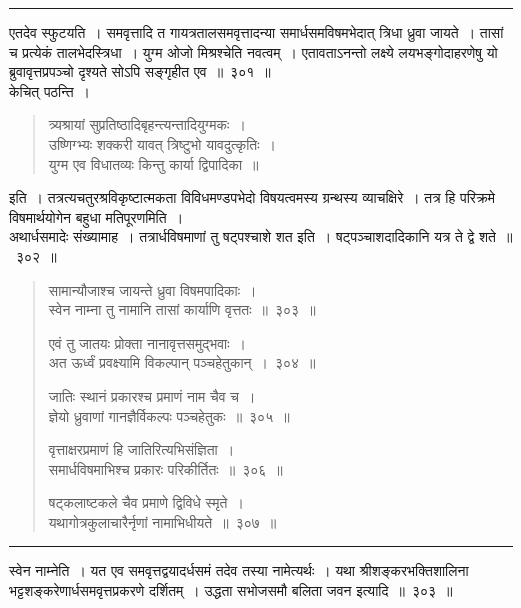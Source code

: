 \documentclass[11pt, openany]{book}
\begin{document}
\hrule

\vspace{2mm}
एतदेव स्फुटयति~। {\qtt समवृत्तादि} त गायत्रतालसमवृत्तादन्या समार्धसमविषमभेदात् त्रिधा ध्रुवा जायते~। तासां च प्रत्येकं तालभेदस्त्रिधा~। {\qtt युग्म ओजो मिश्रश्चेति} नवत्वम्~। एतावताऽनन्तो लक्ष्ये लयभङ्गोदाहरणेषु यो ब्रुवावृत्तप्रपञ्चो दृश्यते सोऽपि सङ्गृहीत एव~॥~३०१~॥\\

केचित् पठन्ति~। 

\begin{quote}
{\qt त्र्यश्रायां सुप्रतिष्ठादिबृहन्त्यन्तादियुग्मकः~। \\
 उष्णिग्भ्यः शक्करी यावत् त्रिष्टुभो यावदुत्कृतिः~।\\
 युग्म एव विधातव्यः किन्तु कार्या द्विपादिका~॥}
\end{quote}

\noindent
इति~। तत्रत्यचतुरश्रविकृष्टात्मकता विविधमण्डपभेदो विषयत्वमस्य ग्रन्थस्य व्याचक्षिरे~। तत्र हि परिक्रमे विषमार्थयोगेन बहुधा मतिपूरणमिति~।\\

अथार्धसमादेः संख्यामाह~। {\qtt तत्रार्धविषमाणां तु षट्पश्चाशे शत} इति~। षट्पञ्चाशदादिकानि यत्र ते द्वे शते~॥~३०२~॥

\newpage

\begin{quote}
{\na सामान्यौजाश्च जायन्ते ध्रुवा विषमपादिकाः~।\\
 स्वेन नाम्ना तु नामानि तासां कार्याणि वृत्ततः~॥~३०३~॥

 एवं तु जातयः प्रोक्ता नानावृत्तसमुद्भवाः~।\\
 अत ऊर्ध्वं प्रवक्ष्यामि विकल्पान् पञ्चहेतुकान्~।~३०४~॥ 

 जातिः स्थानं प्रकारश्च प्रमाणं नाम चैव च~। \\
 ज्ञेयो ध्रुवाणां गानज्ञैर्विकल्पः पञ्चहेतुकः~॥~३०५~॥ 

 वृत्ताक्षरप्रमाणं हि जातिरित्यभिसंज्ञिता~।\\
 समार्धविषमाभिश्च प्रकारः परिकीर्तितः~॥~३०६~॥ 

 षट्कलाष्टकले चैव प्रमाणे द्विविधे स्मृते~।\\
 यथागोत्रकुलाचारैर्नृणां नामाभिधीयते~॥~३०७~॥}
\end{quote}

\hrule

\vspace{2mm}
{\qtt स्वेन नाम्नेति}~। यत एव समवृत्तद्वयादर्धसमं तदेव तस्या नामेत्यर्थः~। यथा श्रीशङ्करभक्तिशालिना {\qtt भट्टशङ्करेणा}र्धसमवृत्तप्रकरणे दर्शितम्~। {\qtt उद्धता सभोजसमौ बलिता जवन} इत्यादि~॥~३०३~॥\\
\end{document}
